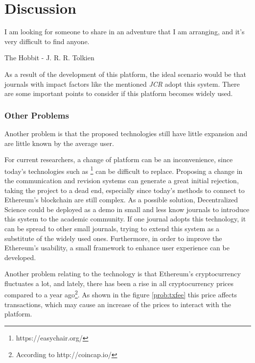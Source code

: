 \chapter{Discussion}

\begin{FraseCelebre}
  \begin{Frase}
    I am looking for someone to share in an adventure that I am arranging, and
    it's very difficult to find anyone.
  \end{Frase}
  \begin{Fuente}
    The Hobbit - J. R. R. Tolkien
  \end{Fuente}
\end{FraseCelebre}

As a result of the development of this platform, the ideal scenario would be
that journals with impact factors like the mentioned \emph{JCR} adopt this
system. There are some important points to consider if this platform becomes
widely used.



\subsection{Other Problems}
\label{sec:other-problems}


Another problem is that the proposed technologies still have little expansion
and are little known by the average user.

For current researchers, a change of platform can be an inconvenience, since
today's technologies such as \footnote{https://easychair.org/} can
be difficult to replace. Proposing a change in the communication and revision
systems can generate a great initial rejection, taking the project to a dead
end, especially since today's methods to connect to Ethereum's blockchain are
still complex. As a possible solution, Decentralized Science could be deployed
as a demo in small and less know journals to introduce this system to the
academic community. If one journal adopts this technology, it can be spread to
other small journals, trying to extend this system as a substitute of the widely
used ones. Furthermore, in order to improve the Ethereum's usability, a small
framework to enhance user experience can be developed.

Another problem relating to the technology is that Ethereum's cryptocurrency
fluctuates a lot, and lately, there has been a rise in all cryptocurrency prices
compared to a year ago\footnote{According to http://coincap.io/}. As shown in
the figure \ref{prob:txfee} this price affects transactions, which may cause an
increase of the prices to interact with the platform.



